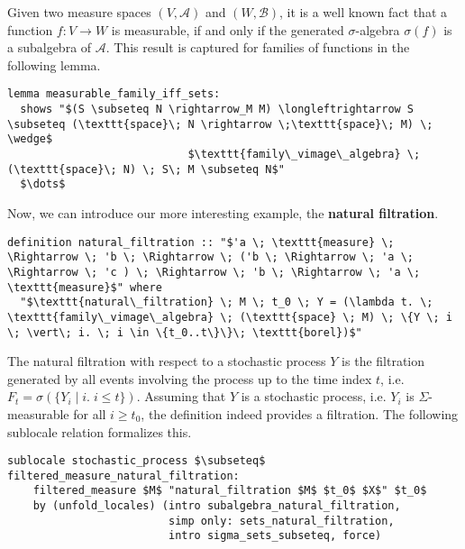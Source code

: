 Given two measure spaces $(V, \mathcal{A})$ and $(W, \mathcal{B})$, it is a well known fact that a function $f : V \rightarrow W$ is measurable, if and only if the generated $\sigma$-algebra $\sigma(f)$ is a subalgebra of $\mathcal{A}$. This result is captured for families of functions in the following lemma.

\begin{isalemma}
{\small
\begin{lstlisting}[style=isabelle]
lemma measurable_family_iff_sets:
  shows "$(S \subseteq N \rightarrow_M M) \longleftrightarrow S \subseteq (\texttt{space}\; N \rightarrow \;\texttt{space}\; M) \; \wedge$
                            $\texttt{family\_vimage\_algebra} \; (\texttt{space}\; N) \; S\; M \subseteq N$"
  $\dots$
\end{lstlisting}
}
\end{isalemma}

Now, we can introduce our more interesting example, the \textbf{natural filtration}.

\begin{isadefinition}
{\small
\begin{lstlisting}[style=isabelle]
definition natural_filtration :: "$'a \; \texttt{measure} \; \Rightarrow \; 'b \; \Rightarrow \; ('b \; \Rightarrow \; 'a \; \Rightarrow \; 'c ) \; \Rightarrow \; 'b \; \Rightarrow \; 'a \; \texttt{measure}$" where
  "$\texttt{natural\_filtration} \; M \; t_0 \; Y = (\lambda t. \; \texttt{family\_vimage\_algebra} \; (\texttt{space} \; M) \; \{Y \; i \; \vert\; i. \; i \in \{t_0..t\}\}\; \texttt{borel})$"
\end{lstlisting}
}
\end{isadefinition}
The natural filtration with respect to a stochastic process $Y$ is the filtration generated by all events involving the process up to the time index $t$, i.e. $F_t = \sigma(\{Y_i \; \vert\; i. \; i \le t\})$. Assuming that $Y$ is a stochastic process, i.e. $Y_i$ is $\Sigma$-measurable for all $i \ge t_0$, the definition indeed provides a filtration. The following sublocale relation formalizes this.

\begin{isalemma}
{\small
\begin{lstlisting}[style=isabelle]
sublocale stochastic_process $\subseteq$ filtered_measure_natural_filtration: 
	filtered_measure $M$ "natural_filtration $M$ $t_0$ $X$" $t_0$
    by (unfold_locales) (intro subalgebra_natural_filtration, 
						 simp only: sets_natural_filtration, 
						 intro sigma_sets_subseteq, force) 
\end{lstlisting}
}
\end{isalemma}

